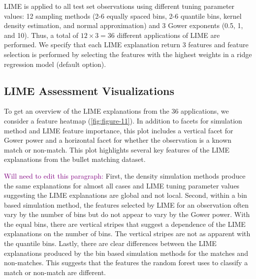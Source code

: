 \documentclass[AMS,STIX2COL]{WileyNJD-v2}\usepackage[]{graphicx}\usepackage[]{color}
\newcommand{\kgc}[1]{\textcolor{purple}{#1}}
\begin{document}
LIME is applied to all test set observations using different tuning parameter values: 12 sampling methods (2-6 equally spaced bins, 2-6 quantile bins, kernel density estimation, and normal approximation) and 3 Gower exponents (0.5, 1, and 10). Thus, a total of $12\times 3=36$ different applications of LIME are performed. We specify that each LIME explanation return 3 features and feature selection is performed by selecting the features with the highest weights in a ridge regression model (default option).







\subsection{LIME Assessment Visualizations} \label{bullet-assess-ex}

To get an overview of the LIME explanations from the 36 applications, we consider a feature heatmap (\autoref{fig:figure-11}). In addition to facets for simulation method and LIME feature importance, this plot includes a vertical facet for Gower power and a horizontal facet for whether the observation is a known match or non-match. This plot highlights several key features of the LIME explanations from the bullet matching dataset.

\kgc{Will need to edit this paragraph:} First, the density simulation methods produce the same explanations for almost all cases and LIME tuning parameter values suggesting the LIME explanations are global and not local. Second, within a bin based simulation method, the features selected by LIME for an observation often vary by the number of bins but do not appear to vary by the Gower power. With the equal bins, there are vertical stripes that suggest a dependence of the LIME explanations on the number of bins. The vertical stripes are not as apparent with the quantile bins. Lastly, there are clear differences between the LIME explanations produced by the bin based simulation methods for the matches and non-matches. This suggests that the features the random forest uses to classify a match or non-match are different. 
\end{document}
